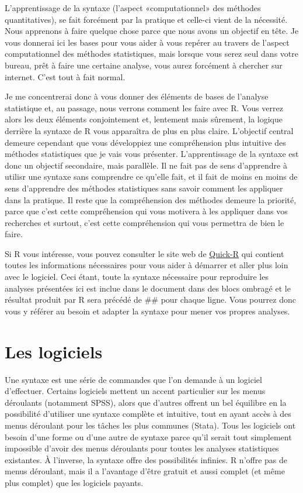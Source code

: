 \documentclass[
]{book}
\begin{document}
L'apprentissage de la syntaxe (l'aspect «computationnel» des méthodes quantitatives), se fait forcément par la pratique et celle-ci vient de la nécessité. Nous apprenons à faire quelque chose parce que nous avons un objectif en tête. Je vous donnerai ici les bases pour vous aider à vous repérer au travers de l'aspect computationnel des méthodes statistiques, mais lorsque vous serez seul dans votre bureau, prêt à faire une certaine analyse, vous aurez forcément à chercher sur internet. C'est tout à fait normal.

Je me concentrerai donc à vous donner des éléments de bases de l'analyse statistique et, au passage, nous verrons comment les faire avec R. Vous verrez alors les deux éléments conjointement et, lentement mais sûrement, la logique derrière la syntaxe de R vous apparaîtra de plus en plus claire. L'objectif central demeure cependant que vous développiez une compréhension plus intuitive des méthodes statistiques que je vais vous présenter. L'apprentissage de la syntaxe est donc un objectif secondaire, mais parallèle. Il ne fait pas de sens d'apprendre à utilisr une syntaxe sans comprendre ce qu'elle fait, et il fait de moins en moins de sens d'apprendre des méthodes statistiques sans savoir comment les appliquer dans la pratique. Il reste que la compréhension des méthodes demeure la priorité, parce que c'est cette compréhension qui vous motivera à les appliquer dans vos recherches et surtout, c'est cette compréhension qui vous permettra de bien le faire.

Si R vous intéresse, vous pouvez consulter le site web de \href{http://www.statmethods.net/index.html}{Quick-R} qui contient toutes les informations nécessaires pour vous aider à démarrer et aller plus loin avec le logiciel. Ceci étant, toute la syntaxe nécessaire pour reproduire les analyses présentées ici est inclue dans le document dans des blocs ombragé et le résultat produit par R sera précédé de \#\# pour chaque ligne. Vous pourrez donc vous y référer au besoin et adapter la syntaxe pour mener vos propres analyses.

\hypertarget{les-logiciels}{%
\section{Les logiciels}\label{les-logiciels}}

Une syntaxe est une série de commandes que l'on demande à un logiciel d'effectuer. Certains logiciels mettent un accent particulier sur les menus déroulants (notamment SPSS), alors que d'autres offrent un bel équilibre en la possibilité d'utiliser une syntaxe complète et intuitive, tout en ayant accès à des menus déroulant pour les tâches les plus communes (Stata). Tous les logiciels ont besoin d'une forme ou d'une autre de syntaxe parce qu'il serait tout simplement impossible d'avoir des menus déroulants pour toutes les analyses statistiques existantes. À l'inverse, la syntaxe offre des possibilités infinies. R n'offre pas de menus déroulant, mais il a l'avantage d'être gratuit et aussi complet (et même plus complet) que les logiciels payants.
\end{document}
